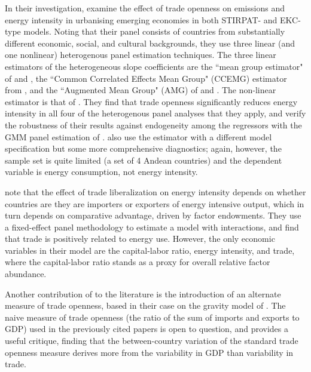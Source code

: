 \documentclass[12pt,a4paper]{article}
\begin{document}
In their investigation, \cite{rafiqUrbanizationOpennessEmissions2016} examine the effect of trade openness on emissions and energy intensity in urbanising emerging economies in both STIRPAT- and EKC-type models.
Noting that their panel consists of countries from substantially different economic, social,
and cultural backgrounds, they use three linear (and one nonlinear) heterogenous panel estimation techniques.
The three linear estimators of the heterogeneous slope coefficients are the ``mean group estimator" of \cite{pesaranRoleEconomicTheory1997} and \cite{pesaranEstimatingLongrunRelationships1995}, the ``Common Correlated Effects Mean Group" (CCEMG) estimator from \cite{pesaranEstimationInferenceLarge2006}, 
and the ``Augmented Mean Group" (AMG) of \cite{eberhardtCrosssectionDependenceNonstationary2009} and \mbox{\cite{eberhardtProductivityAnalysisGlobal2010}}.
The non-linear estimator is that of \cite{kapetaniosNonlinearPanelData2014}.
They find that trade openness significantly reduces energy intensity in all four of the heterogenous panel
analyses that they apply, and verify the robustness of their results against endogeneity among the regressors with the GMM panel estimation of \cite{arellanoTestsSpecificationPanel1991}.
\cite{koengkanPositiveImpactTrade2018} also use the \cite{arellanoTestsSpecificationPanel1991} estimator with a different model specification but some more comprehensive diagnostics; again, however, the sample set is quite limited (a set of 4 Andean countries) and the dependent variable is energy consumption, not energy intensity.

\cite{coleDoesTradeLiberalization2006}\footnotemark{} note that the effect of trade liberalization on energy intensity depends on whether countries are they are importers or exporters of energy intensive output, which in turn depends on comparative advantage, driven by factor endowments. 
They use a fixed-effect panel methodology to estimate a model with interactions, and find that trade is positively related to energy use.
However, the only economic variables in their model are the capital-labor ratio, energy intensity, and trade, where the capital-labor ratio stands as a proxy for overall relative factor abundance.

Another contribution of \cite{coleDoesTradeLiberalization2006} to the literature is the introduction of an alternate measure of trade openness, based in their case on the gravity model of \cite{frankelEstimateEffectCommon2002}.
The naive measure of trade openness (the ratio of the sum of imports and exports to GDP) used in the previously cited papers is open to question, and \cite{fujiiWhatDoesTrade2019} provides a useful critique, finding that the between-country variation of the standard trade openness measure derives more from the variability in GDP than variability in trade.
\end{document}
